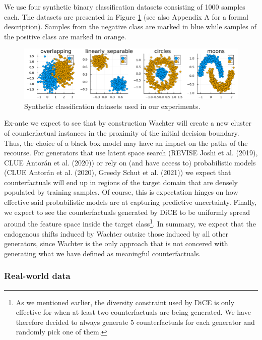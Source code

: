\documentclass[conference,final,]{IEEEtran}
\begin{document}
We use four synthetic binary classification datasets consisting of 1000 samples each. The datasets are presented in Figure \ref{fig:synthetic-data} (see also Appendix A for a formal description). Samples from the negative class are marked in blue while samples of the positive class are marked in orange.

\begin{figure}

{\centering \includegraphics[width=0.9\linewidth]{www/synthetic_data} 

}

\caption{Synthetic classification datasets used in our experiments.}\label{fig:synthetic-data}
\end{figure}

Ex-ante we expect to see that by construction Wachter will create a new cluster of counterfactual instances in the proximity of the initial decision boundary. Thus, the choice of a black-box model may have an impact on the paths of the recourse. For generators that use latent space search (REVISE Joshi et al. (2019), CLUE Antorán et al. (2020)) or rely on (and have access to) probabilistic models (CLUE Antorán et al. (2020), Greedy Schut et al. (2021)) we expect that counterfactuals will end up in regions of the target domain that are densely populated by training samples. Of course, this is expectation hinges on how effective said probabilistic models are at capturing predictive uncertainty. Finally, we expect to see the counterfactuals generated by DiCE to be uniformly spread around the feature space inside the target class\footnote{As we mentioned earlier, the diversity constraint used by DiCE is only effective for when at least two counterfactuals are being generated. We have therefore decided to always generate 5 counterfactuals for each generator and randomly pick one of them.}. In summary, we expect that the endogenous shifts induced by Wachter outsize those induced by all other generators, since Wachter is the only approach that is not concered with generating what we have defined as meaningful counterfactuals.

\hypertarget{real-world-data}{%
\subsubsection{Real-world data}\label{real-world-data}}
\end{document}
